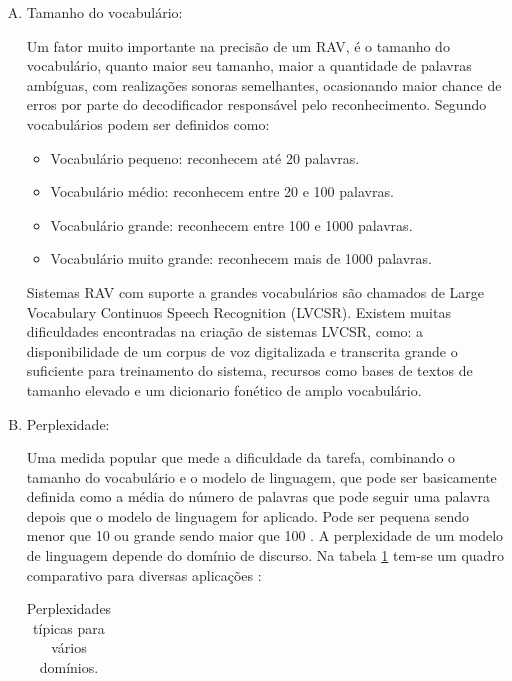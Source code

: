 \begin{enumerate}[A)]
\item Tamanho do vocabulário:

Um fator muito importante na precisão de um RAV, é o tamanho do vocabulário, quanto maior seu tamanho, maior a quantidade de palavras ambíguas, com realizações sonoras semelhantes, ocasionando maior chance de erros por parte do decodificador responsável pelo reconhecimento. Segundo \cite{RavIsolAnderson} vocabulários podem ser definidos como:

\begin{itemize}
\item Vocabulário pequeno: reconhecem até 20 palavras. 
\item Vocabulário médio: reconhecem entre 20 e 100 palavras. 
\item Vocabulário grande: reconhecem entre 100 e 1000 palavras. 
\item Vocabulário muito grande: reconhecem mais de 1000 palavras. 
\end{itemize}

Sistemas RAV com suporte a grandes vocabulários são chamados de Large Vocabulary Continuos Speech Recognition (LVCSR). Existem muitas dificuldades encontradas na criação de sistemas LVCSR, como: a disponibilidade de um corpus de voz digitalizada e transcrita grande o suficiente para treinamento do sistema, recursos como bases de textos de
tamanho elevado e um dicionario fonético de amplo vocabulário.

\item Perplexidade: 

Uma medida popular que mede a dificuldade da tarefa, combinando o tamanho do vocabulário e o modelo de linguagem, que pode ser basicamente definida como a média do número de palavras que pode seguir uma palavra depois que o modelo de linguagem for aplicado. Pode ser pequena sendo menor que 10 ou grande sendo maior que 100 \cite{RavHmmCarlos}. A perplexidade de um modelo de linguagem depende do domínio de discurso. Na tabela \ref{tabPerp} tem-se um quadro comparativo para diversas aplicações \cite{SurveyCole} :

\begin{table}[H] %
\centering
\caption{Perplexidades típicas para vários domínios.} %
\label{tabPerp}
\begin{tabular}{cc} %


\end{tabular}
\end{table}
\end{enumerate}
